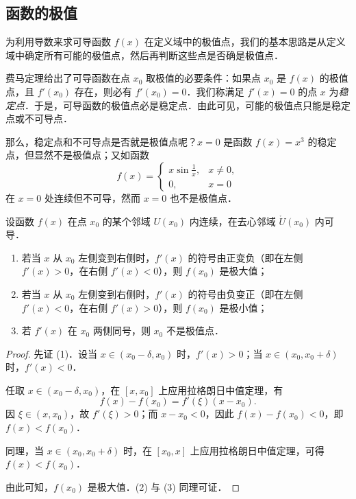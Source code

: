 \subsection{函数的极值}

为利用导数来求可导函数 $f(x)$ 在定义域中的极值点，我们的基本思路是从定义域中确定所有可能的极值点，然后再判断这些点是否确是极值点．

费马定理给出了可导函数在点 $x_0$ 取极值的必要条件：如果点 $x_0$ 是 $f(x)$ 的极值点，且 $f'(x_0)$ 存在，则必有 $f'(x_0)=0$．我们称满足 $f'(x)=0$ 的点 $x$ 为\emph{稳定点}．于是，可导函数的极值点必是稳定点．由此可见，可能的极值点只能是稳定点或不可导点．

那么，稳定点和不可导点是否就是极值点呢？$x=0$ 是函数 $f(x)=x^3$ 的稳定点，但显然不是极值点；又如函数
\[
f(x)=\begin{cases}
x\sin\frac{1}{x}, & x\neq0,\\
0, & x=0
\end{cases}
\]
在 $x=0$ 处连续但不可导，然而 $x=0$ 也不是极值点．

\begin{theorem}[极值第一充分条件]\label{thm:5-10}
设函数 $f(x)$ 在点 $x_{0}$ 的某个邻域 $U(x_{0})$ 内连续，在去心邻域 $\mathring{U}(x_{0})$ 内可导．
\begin{enumerate}[(1)]
\item 若当 $x$ 从 $x_{0}$ 左侧变到右侧时，$f'(x)$ 的符号由正变负（即在左侧 $f'(x)>0$，在右侧 $f'(x)<0$），则 $f(x_{0})$ 是极大值；
\item 若当 $x$ 从 $x_{0}$ 左侧变到右侧时，$f'(x)$ 的符号由负变正（即在左侧 $f'(x)<0$，在右侧 $f'(x)>0$），则 $f(x_{0})$ 是极小值；
\item 若 $f'(x)$ 在 $x_{0}$ 两侧同号，则 $x_{0}$ 不是极值点．
\end{enumerate}
\end{theorem}

\begin{proof}
先证 (1)．设当 $x \in (x_0 - \delta, x_0)$ 时，$f'(x) > 0$；当 $x \in (x_0, x_0 + \delta)$ 时，$f'(x) < 0$．

任取 $x \in (x_0 - \delta, x_0)$，在 $[x, x_0]$ 上应用拉格朗日中值定理，有
\[
f(x) - f(x_0) = f'(\xi)(x - x_0).
\]
因 $\xi \in (x, x_0)$，故 $f'(\xi) > 0$；而 $x - x_0 < 0$，因此 $f(x) - f(x_0) < 0$，即 $f(x) < f(x_0)$．

同理，当 $x \in (x_0, x_0 + \delta)$ 时，在 $[x_0, x]$ 上应用拉格朗日中值定理，可得 $f(x) < f(x_0)$．

由此可知，$f(x_0)$ 是极大值．(2) 与 (3) 同理可证．
\end{proof}

